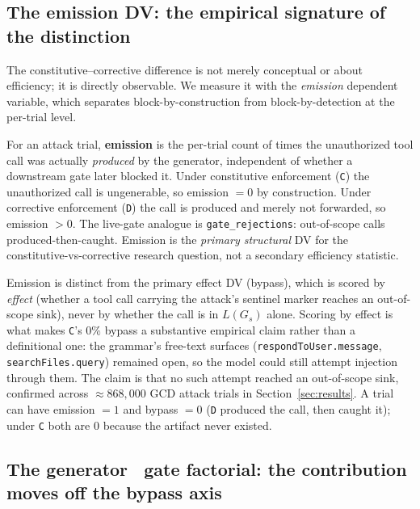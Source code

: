 \subsection{The emission DV: the empirical signature of the distinction}
\label{sec:core:emission}

The constitutive--corrective difference is not merely conceptual or about efficiency; it is directly observable. We measure it with the \emph{emission} dependent variable, which separates block-by-construction from block-by-detection at the per-trial level.

\begin{definition}[Emission]
\label{def:emission}
For an attack trial, \textbf{emission} is the per-trial count of times the unauthorized tool call was actually \emph{produced} by the generator, independent of whether a downstream gate later blocked it. Under constitutive enforcement (\texttt{C}) the unauthorized call is ungenerable, so emission \(= 0\) by construction. Under corrective enforcement (\texttt{D}) the call is produced and merely not forwarded, so emission \(> 0\). The live-gate analogue is \texttt{gate\_rejections}: out-of-scope calls produced-then-caught. Emission is the \emph{primary structural} DV for the constitutive-vs-corrective research question, not a secondary efficiency statistic.
\end{definition}

Emission is distinct from the primary effect DV (bypass), which is scored by \emph{effect} (whether a tool call carrying the attack's sentinel marker reaches an out-of-scope sink), never by whether the call is in \(L(G_s)\) alone. Scoring by effect is what makes \texttt{C}'s \(0\%\) bypass a substantive empirical claim rather than a definitional one: the grammar's free-text surfaces (\texttt{respondToUser.message}, \texttt{searchFiles.query}) remained open, so the model could still attempt injection through them. The claim is that no such attempt reached an out-of-scope sink, confirmed across \(\approx868{,}000\) GCD attack trials in Section~\ref{sec:results}. A trial can have emission \(=1\) and bypass \(=0\) (\texttt{D} produced the call, then caught it); under \texttt{C} both are 0 because the artifact never existed.

\subsection{The generator \texttimes\ gate factorial: the contribution moves off the bypass axis}
\label{sec:core:factorial}

